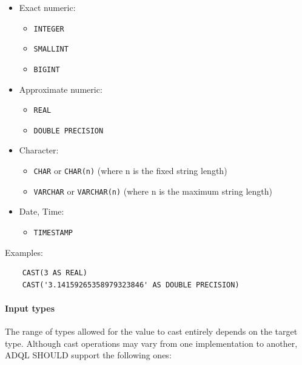 \documentclass[11pt,a4paper]{ivoa}
\begin{document}
\begin{itemize}
    \item Exact numeric:
    \begin{itemize}
        \item \verb:INTEGER:
        \item \verb:SMALLINT:
        \item \verb:BIGINT:
    \end{itemize}
    \item Approximate numeric:
    \begin{itemize}
        \item \verb:REAL:
        \item \verb:DOUBLE PRECISION:
    \end{itemize}
    \item Character:
    \begin{itemize}
        \item \verb:CHAR: or \verb:CHAR(n): (where n is the fixed string length)
        \item \verb:VARCHAR: or \verb:VARCHAR(n): (where n is the maximum string length)
    \end{itemize}
    \item Date, Time:
    \begin{itemize}
        \item \verb:TIMESTAMP:
    \end{itemize}
\end{itemize}

Examples:

\begin{verbatim}
    CAST(3 AS REAL)
    CAST('3.14159265358979323846' AS DOUBLE PRECISION)
\end{verbatim}

\paragraph{Input types}

The range of types allowed for the value to cast entirely depends on the target
type. Although cast operations may vary from one implementation to another, ADQL
SHOULD support the following ones:
\end{document}
